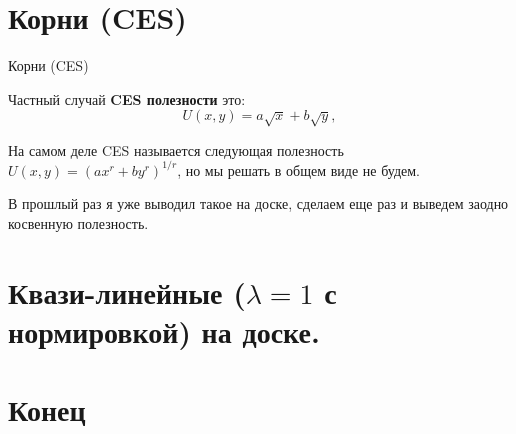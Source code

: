 \documentclass{beamer}
\begin{document}
\section{Корни (CES)}

\begin{frame}{Корни (CES)}

\begin{definition}
Частный случай \textbf{CES полезности} это:
$$U(x, y) = a \sqrt{x} + b \sqrt{y},$$ 
\end{definition}

На самом деле CES называется следующая полезность $U(x, y) = (a x^r + b y^r)^{1/r}$, но мы решать в общем виде не будем.

В прошлый раз я уже выводил такое на доске, сделаем еще раз и выведем заодно косвенную полезность.

\end{frame}

\section{Квази-линейные ($\lambda = 1$ с нормировкой) на доске.}

\section{Конец}
\end{document}
